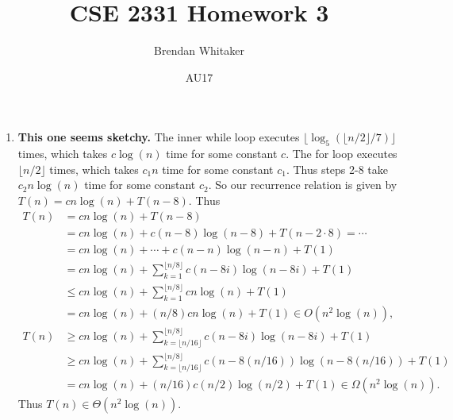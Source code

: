 \documentclass[10pt,oneside,reqno]{amsart}
\theoremstyle{plain}
\theoremstyle{definition}
\begin{document}
\title{CSE 2331 Homework 3}

\date{AU17}

\author[Brendan Whitaker]{Brendan Whitaker}

\maketitle

\begin{enumerate}[label=\arabic*.]

\item \textbf{This one seems sketchy. } The inner while loop executes $\lfloor \log_5(\lfloor n/2 \rfloor /7) \rfloor$ times, which takes $c\log(n)$ time for some constant $c$. The for loop executes $\lfloor n/2 \rfloor$ times, which takes $c_1n$ time for some constant $c_1$. Thus steps 2-8 take $c_2n\log(n)$ time for some constant $c_2$. So our recurrence relation is given by $T(n) = cn\log(n) + T(n - 8)$. Thus
\begin{equation}
\begin{aligned}
T(n) &= cn\log(n) + T(n - 8) \\
&= cn\log(n) + c(n - 8)\log(n- 8) + T(n - 2\cdot 8) = \cdots\\
&= cn\log(n) + \cdots + c(n - n)\log(n - n) + T(1)\\
&= cn\log(n) + \sum_{k = 1}^{\lfloor n/8 \rfloor} c(n - 8i)\log(n - 8i) + T(1)\\
&\leq cn\log(n) + \sum_{k = 1}^{\lfloor n/8 \rfloor} cn\log(n) + T(1)\\
&= cn\log(n) + (n/8)cn\log(n) + T(1) \in O(n^2 \log(n)),\\
T(n) &\geq cn\log(n) + \sum_{k = \lfloor n/16 \rfloor}^{\lfloor n/8 \rfloor} c(n - 8i)\log(n - 8i) + T(1)\\
& \geq cn\log(n) + \sum_{k = \lfloor n/16 \rfloor}^{\lfloor n/8 \rfloor} c(n - 8(n/16))\log(n - 8(n/16)) + T(1)\\
&= cn\log(n) + (n/16)c(n/2)\log(n/2) + T(1) \in \Omega (n^2\log(n)). 
\end{aligned}
\end{equation}
Thus $T(n) \in \Theta(n^2 \log(n))$. \\


\end{enumerate}
\end{document}
